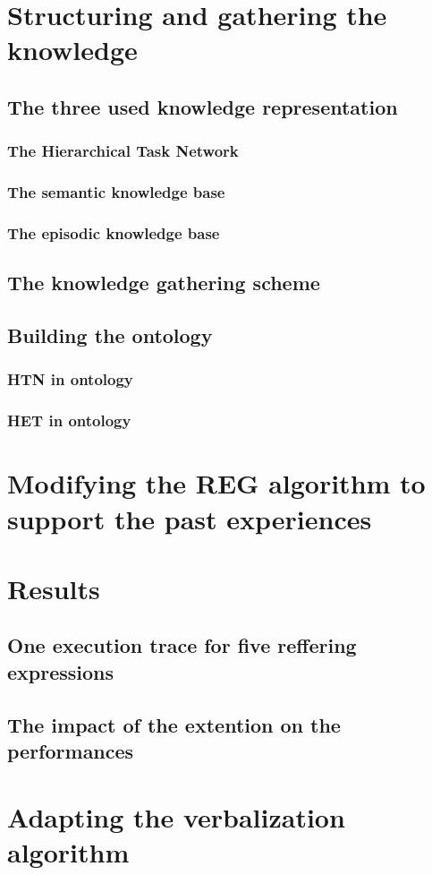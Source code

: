 \section{Structuring and gathering the knowledge}

\subsection{The three used knowledge representation}

\subsubsection{The Hierarchical Task Network}

\subsubsection{The semantic knowledge base}

\subsubsection{The episodic knowledge base}

\subsection{The knowledge gathering scheme}

\subsection{Building the ontology}

\subsubsection{HTN in ontology}

\subsubsection{HET in ontology}

\section{Modifying the REG algorithm to support the past experiences}

\section{Results}

\subsection{One execution trace for five reffering expressions}

\subsection{The impact of the extention on the performances}

\section{Adapting the verbalization algorithm}